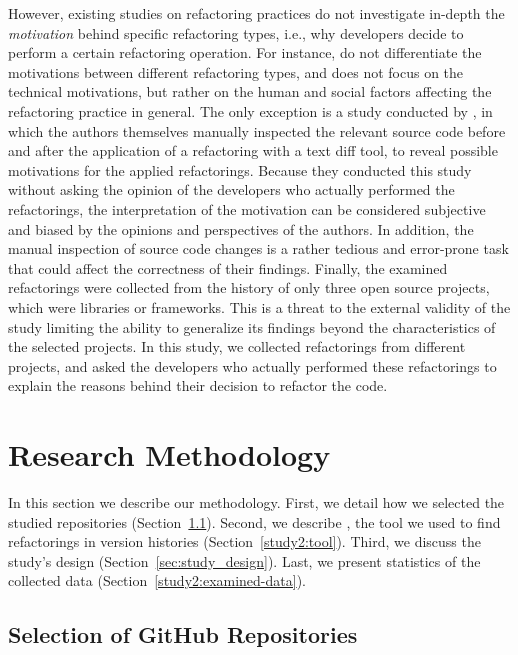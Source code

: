 However, existing studies on refactoring practices do not investigate in-depth the {\em motivation} behind specific refactoring types, i.e., why developers decide to perform a certain refactoring operation.
For instance, \cite{kim-tse-2014} do not differentiate the motivations between different refactoring types,
and \cite{Wang:2009} does not focus on the technical motivations, but rather on the human and social factors affecting the refactoring practice in general.
The only exception is a study conducted by \cite{tsantalis_empiricalstudy},
in which the authors themselves manually inspected the relevant source code before and after the application of a refactoring with a text diff tool, to reveal possible motivations for the applied refactorings.
Because they conducted this study without asking the opinion of the developers who actually performed the refactorings,
the interpretation of the motivation can be considered subjective and biased by the opinions and perspectives of the authors.
In addition, the manual inspection of source code changes is a rather tedious and error-prone task that could affect the correctness of their findings.
Finally, the examined refactorings were collected from the history of only three open source projects, which were libraries or frameworks.
This is a threat to the external validity of the study limiting the ability to generalize its findings beyond the characteristics of the selected projects.
In this study, we collected refactorings from \studiedProjects different projects, and asked the developers who actually performed these refactorings to explain the reasons behind their decision to refactor the code.


\section{Research Methodology}
\label{SecMethodology}

In this section we describe our methodology. First, we detail how we selected the studied repositories (Section~\ref{study2:select-repos}). Second, we describe \toolName, the tool we used to find refactorings in version histories (Section~\ref{study2:tool}). Third, we discuss the study's design (Section~\ref{sec:study_design}). Last, we present statistics of the collected data (Section~\ref{study2:examined-data}).

\subsection{Selection of GitHub Repositories}
\label{study2:select-repos}

